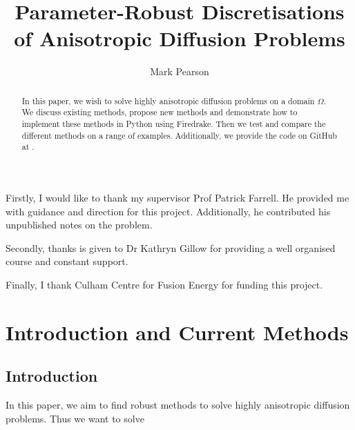 \documentclass[12pt]{ociamthesis}
\title{Parameter-Robust Discretisations of Anisotropic 
Diffusion Problems}
\author{Mark Pearson}
\begin{document}
\maketitle

\thispagestyle{empty}

\newpage

\begin{acknowledgements} 

Firstly, I would like to thank my supervisor Prof Patrick Farrell. He provided me with guidance and direction for this project. Additionally, he contributed his unpublished notes on the problem.

Secondly, thanks is given to Dr Kathryn Gillow for providing a well organised course and constant support.

Finally, I thank Culham Centre for Fusion Energy for funding this project. 

\end{acknowledgements}

\newpage

\begin{abstract}
In this paper, we wish to solve highly anisotropic diffusion problems on a domain $\Omega$. We discuss existing methods, propose new methods and demonstrate how to implement these methods in Python using Firedrake. Then we test and compare the different methods on a range of examples. Additionally, we provide the code on GitHub at \cite{Hub}.
\end{abstract}

\newpage
\setcounter{page}{1}

\tableofcontents


\chapter{Introduction and Current Methods}
\section{Introduction}
In this paper, we aim to find robust methods to solve highly anisotropic diffusion problems. Thus we want to solve
\end{document}

